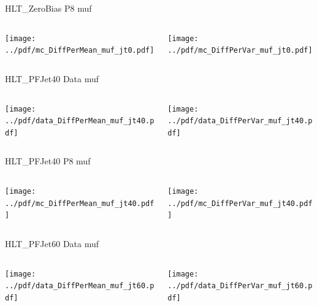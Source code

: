 \documentclass[9pt]{beamer}
\begin{document}
\begin{frame}[t]{HLT\_ZeroBias P8 muf}
\begin{columns}[T]
  \begin{column}{.5\textwidth}
  \texttt{[image: ../pdf/mc\_DiffPerMean\_muf\_jt0.pdf]}
  \end{column}
  \begin{column}{.5\textwidth}
  \texttt{[image: ../pdf/mc\_DiffPerVar\_muf\_jt0.pdf]}
  \end{column}
\end{columns}
\end{frame}

\begin{frame}[t]{HLT\_PFJet40 Data muf}
\begin{columns}[T]
  \begin{column}{.5\textwidth}
  \texttt{[image: ../pdf/data\_DiffPerMean\_muf\_jt40.pdf]}
  \end{column}
  \begin{column}{.5\textwidth}
  \texttt{[image: ../pdf/data\_DiffPerVar\_muf\_jt40.pdf]}
  \end{column}
\end{columns}
\end{frame}

\begin{frame}[t]{HLT\_PFJet40 P8 muf}
\begin{columns}[T]
  \begin{column}{.5\textwidth}
  \texttt{[image: ../pdf/mc\_DiffPerMean\_muf\_jt40.pdf]}
  \end{column}
  \begin{column}{.5\textwidth}
  \texttt{[image: ../pdf/mc\_DiffPerVar\_muf\_jt40.pdf]}
  \end{column}
\end{columns}
\end{frame}

\begin{frame}[t]{HLT\_PFJet60 Data muf}
\begin{columns}[T]
  \begin{column}{.5\textwidth}
  \texttt{[image: ../pdf/data\_DiffPerMean\_muf\_jt60.pdf]}
  \end{column}
  \begin{column}{.5\textwidth}
  \texttt{[image: ../pdf/data\_DiffPerVar\_muf\_jt60.pdf]}
  \end{column}
\end{columns}
\end{frame}
\end{document}
